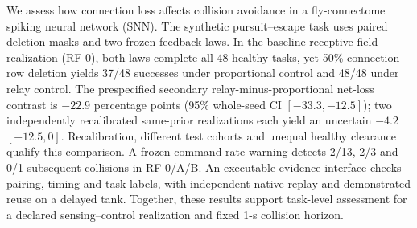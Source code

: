 We assess how connection loss affects collision avoidance in a fly-connectome spiking neural network (SNN). The synthetic pursuit--escape task uses paired deletion masks and two frozen feedback laws. In the baseline receptive-field realization (RF-0), both laws complete all 48 healthy tasks, yet 50\% connection-row deletion yields 37/48 successes under proportional control and 48/48 under relay control. The prespecified secondary relay-minus-proportional net-loss contrast is $-22.9$ percentage points (95\% whole-seed CI $[-33.3,-12.5]$); two independently recalibrated same-prior realizations each yield an uncertain $-4.2$ $[-12.5,0]$. Recalibration, different test cohorts and unequal healthy clearance qualify this comparison. A frozen command-rate warning detects 2/13, 2/3 and 0/1 subsequent collisions in RF-0/A/B. An executable evidence interface checks pairing, timing and task labels, with independent native replay and demonstrated reuse on a delayed tank. Together, these results support task-level assessment for a declared sensing--control realization and fixed 1-s collision horizon.
